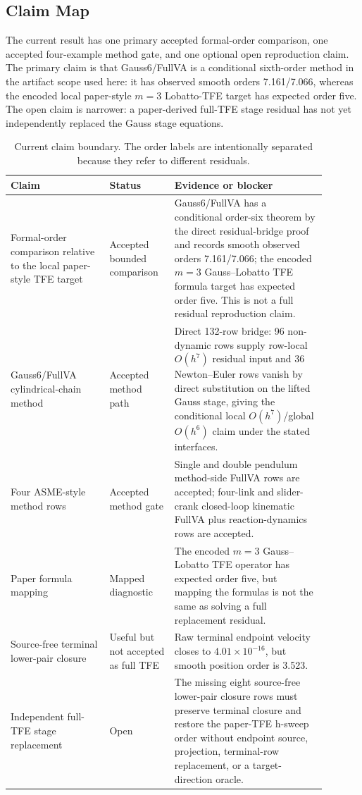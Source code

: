 \documentclass[11pt]{article}
\newcommand{\method}{Gauss6/FullVA}
\newcommand{\tfe}{TFE}
\begin{document}
\subsection{Claim Map}

The current result has one primary accepted formal-order comparison, one accepted
four-example method gate, and one optional open reproduction claim.  The
primary claim is that \method{} is a conditional sixth-order method in the
artifact scope used here: it has observed smooth orders 7.161/7.066, whereas
the encoded local paper-style $m=3$ Lobatto-\tfe{} target has expected order
five.  The open claim is narrower: a paper-derived
full-\tfe{} stage residual has not yet independently replaced the Gauss stage
equations.

\begin{table}[t]
\centering
\caption{Current claim boundary.  The order labels are intentionally separated
because they refer to different residuals.}
\label{tab:claim-map}
\begin{tabular}{P{0.29\linewidth}P{0.17\linewidth}P{0.43\linewidth}}
\toprule
Claim & Status & Evidence or blocker \\
\midrule
Formal-order comparison relative to the local paper-style \tfe{} target &
Accepted bounded comparison &
\method{} has a conditional order-six theorem by the direct residual-bridge
proof and records smooth observed orders 7.161/7.066; the encoded $m=3$
Gauss--Lobatto \tfe{} formula target has expected order five.  This is not a
full residual reproduction claim. \\
Gauss6/FullVA cylindrical-chain method &
Accepted method path &
Direct 132-row bridge: 96 non-dynamic rows supply row-local \(O(h^7)\)
residual input and 36 Newton--Euler rows vanish by direct substitution on the
lifted Gauss stage, giving the conditional local \(O(h^7)\)/global \(O(h^6)\)
claim under the stated interfaces. \\
Four ASME-style method rows &
Accepted method gate &
Single and double pendulum method-side FullVA rows are accepted; four-link and
slider-crank closed-loop kinematic FullVA plus reaction-dynamics rows are
accepted. \\
Paper formula mapping &
Mapped diagnostic &
The encoded $m=3$ Gauss--Lobatto \tfe{} operator has expected order five, but
mapping the formulas is not the same as solving a full replacement residual. \\
Source-free terminal lower-pair closure &
Useful but not accepted as full \tfe{} &
Raw terminal endpoint velocity closes to $4.01\times10^{-16}$, but smooth
position order is 3.523. \\
Independent full-\tfe{} stage replacement &
Open &
The missing eight source-free lower-pair closure rows must preserve terminal
closure and restore the paper-\tfe{} h-sweep order without endpoint source,
projection, terminal-row replacement, or a target-direction oracle. \\
\bottomrule
\end{tabular}
\end{table}
\end{document}
